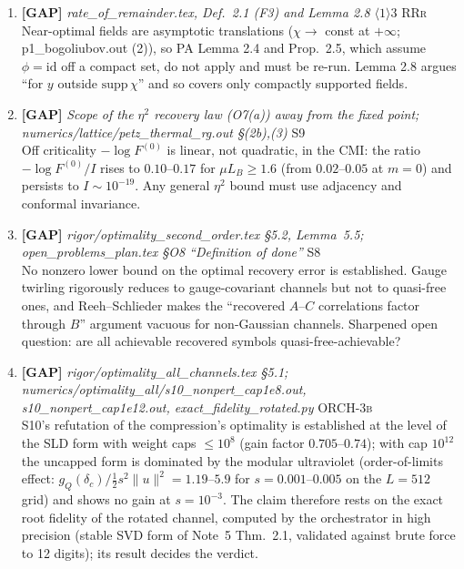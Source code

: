 \documentclass[11pt]{article}
\begin{document}
\begin{enumerate}[leftmargin=1.6em,itemsep=6pt]
\item \textbf{[GAP]} \emph{rate\_of\_remainder.tex, Def.\ 2.1 (F3) and Lemma 2.8 $\langle1\rangle3$} \hfill\textsc{RRr}\\ Near-optimal fields are asymptotic translations ($\chi\to$ const at $+\infty$; p1\_bogoliubov.out (2)), so PA Lemma 2.4 and Prop.\ 2.5, which assume $\phi=\mathrm{id}$ off a compact set, do not apply and must be re-run. Lemma 2.8 argues ``for $y$ outside $\mathrm{supp}\,\chi$'' and so covers only compactly supported fields.
\item \textbf{[GAP]} \emph{Scope of the \(\eta^2\) recovery law (O7(a)) away from the fixed point; numerics/lattice/petz\_thermal\_rg.out \S(2b),(3)} \hfill\textsc{S9}\\ Off criticality \(-\log F^{(0)}\) is linear, not quadratic, in the CMI: the ratio \(-\log F^{(0)}/I\) rises to \(0.10\)--\(0.17\) for \(\mu L_B\ge1.6\) (from \(0.02\)--\(0.05\) at \(m=0\)) and persists to \(I\sim10^{-19}\). Any general \(\eta^2\) bound must use adjacency and conformal invariance.
\item \textbf{[GAP]} \emph{rigor/optimality\_second\_order.tex \S5.2, Lemma~5.5; open\_problems\_plan.tex \S O8 ``Definition of done''} \hfill\textsc{S8}\\ No nonzero lower bound on the optimal recovery error is established. Gauge twirling rigorously reduces to gauge-covariant channels but not to quasi-free ones, and Reeh--Schlieder makes the ``recovered \(A\)--\(C\) correlations factor through \(B\)'' argument vacuous for non-Gaussian channels. Sharpened open question: are all achievable recovered symbols quasi-free-achievable?
\item \textbf{[GAP]} \emph{rigor/optimality\_all\_channels.tex \S5.1; numerics/optimality\_all/s10\_nonpert\_cap1e8.out, s10\_nonpert\_cap1e12.out, exact\_fidelity\_rotated.py} \hfill\textsc{ORCH-3b}\\ S10's refutation of the compression's optimality is established at the level of the SLD form with weight caps \(\le10^{8}\) (gain factor \(0.705\)--\(0.74\)); with cap \(10^{12}\) the uncapped form is dominated by the modular ultraviolet (order-of-limits effect: \(g_Q(\delta_c)/\frac12s^2\lVert u\rVert^2=1.19\)--\(5.9\) for \(s=0.001\)--\(0.005\) on the \(L=512\) grid) and shows no gain at \(s=10^{-3}\). The claim therefore rests on the exact root fidelity of the rotated channel, computed by the orchestrator in high precision (stable SVD form of Note~5 Thm.~2.1, validated against brute force to 12 digits); its result decides the verdict.

\end{enumerate}
\end{document}

